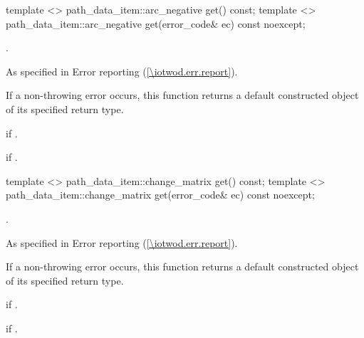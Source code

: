 \begin{itemdecl}
    template <>
    path_data_item::arc_negative get() const;
    template <>
    path_data_item::arc_negative get(error_code& ec) const noexcept;
\end{itemdecl}
\begin{itemdescr}
	\pnum
	\returns
	.
	
	\pnum
	\throws
	As specified in Error reporting (\ref{\iotwod.err.report}).
	
	\pnum
	\remarks
	If a non-throwing error occurs, this function returns a default constructed object of its specified return type.
	
	\pnum
	\errors
	 if .
	
	\pnum
	 if .

\end{itemdescr}

\begin{itemdecl}
    template <>
    path_data_item::change_matrix get() const;
    template <>
    path_data_item::change_matrix get(error_code& ec) const noexcept;
\end{itemdecl}
\begin{itemdescr}
	\pnum
	\returns
	.
	
	\pnum
	\throws
	As specified in Error reporting (\ref{\iotwod.err.report}).
	
	\pnum
	\remarks
	If a non-throwing error occurs, this function returns a default constructed object of its specified return type.
	
	\pnum
	\errors
	 if .
	
	\pnum
	 if .

\end{itemdescr}

